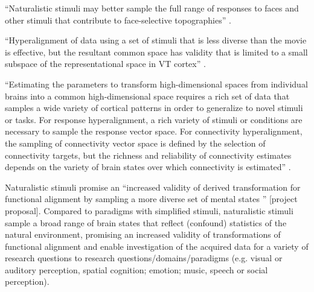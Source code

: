 %
``Naturalistic stimuli may better sample the full range of responses to faces
and other stimuli that contribute to face-selective topographies''
\citep{jiahui2020predicting}.

%
``Hyperalignment of data using a set of stimuli that is less diverse than the
movie is effective, but the resultant common space has validity that is limited
to a small subspace of the representational space in VT cortex''
\citep{haxby2011common}.

%
``Estimating the parameters to transform high-dimensional spaces from individual
brains into a common high-dimensional space requires a rich set of data that
samples a wide variety of cortical patterns in order to generalize to novel
stimuli or tasks.
%
For response hyperalignment, a rich variety of stimuli or conditions are
necessary to sample the response vector space.
%
For connectivity hyperalignment, the sampling of connectivity vector space is
defined by the selection of connectivity targets, but the richness and
reliability of connectivity estimates depends on the variety of brain states
over which connectivity is estimated'' \citep{haxby2020hyperalignment}.


%
Naturalistic stimuli promise an ``increased validity of derived transformation
for functional alignment by sampling a more diverse set of mental states  ''
[project proposal].
%
Compared to paradigms with simplified stimuli, naturalistic stimuli sample a
broad range of brain states \citep{guntupalli2016model, haxby2011common} that
reflect (confound) statistics of the natural environment, promising an increased
validity of transformations of functional alignment and enable investigation
of the acquired data for a variety of research questions to research
questions/domains/paradigms (e.g.  visual or auditory perception, spatial
cognition; emotion; music, speech or social perception).


